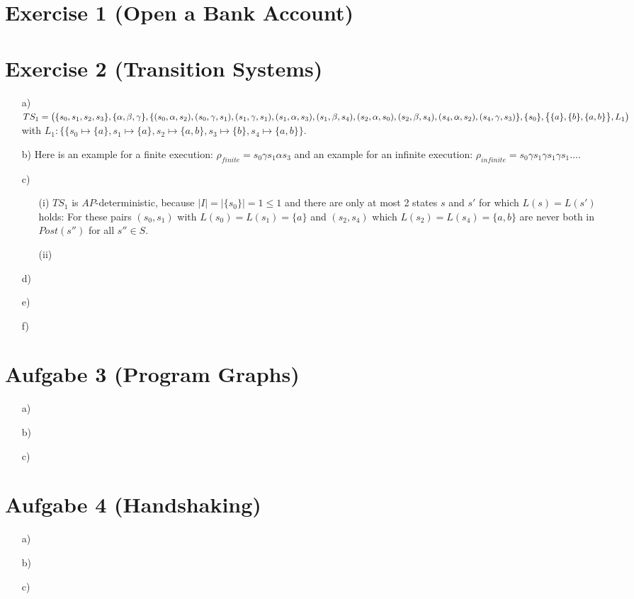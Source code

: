\documentclass[a4paper,11pt]{scrartcl}
\begin{document}
	
	\section*{Exercise 1 (Open a Bank Account)}
	
	
	\section*{Exercise 2 (Transition Systems)}
	
	\begin{itemize}
		\item[a)] $ TS_1 = \bigl( \{s_0, s_1, s_2, s_3\}, \{\alpha,\beta, \gamma\}, \\
		\{ (s_0, \alpha, s_2), (s_0, \gamma, s_1), (s_1, \gamma, s_1), (s_1, \alpha, s_3), (s_1, \beta, s_4), (s_2, \alpha, s_0), (s_2, \beta, s_4), (s_4, \alpha, s_2), (s_4, \gamma, s_3)\},\\
		\{s_0\}, \bigl\{ \{a\}, \{b\}, \{a,b\} \bigr\}, L_1 \bigr)$\\
		with $L_1: \bigl\{ \{s_0 \mapsto \{a\}, s_1 \mapsto \{a\}, s_2 \mapsto \{a,b\}, s_3 \mapsto \{b\}, s_4 \mapsto \{a,b\} \bigr\}$.
		\item[b)] Here is an example for a finite execution: $\rho_{finite} = s_0 \gamma s_1 \alpha s_3$ and an example for an infinite execution: $\rho_{infinite} = s_0 \gamma s_1 \gamma s_1 \gamma s_1 \dots$.
		\item[c)]
		\begin{itemize}
			\item[(i)] $TS_1$ is $AP$-deterministic, because $\mid I \mid = \mid \{s_0\} \mid = 1 \leq 1$ and there are only at most 2 states $s$ and $s'$ for which $L(s)=L(s')$ holds: For these pairs $(s_0, s_1)$ with $L(s_0)=L(s_1)=\{a\}$ and $(s_2, s_4)$ which $L(s_2)=L(s_4)=\{a, b\}$ are never both in $Post(s'')$ for all $s'' \in S$.
			
			
			\item[(ii)]
		\end{itemize}
		\item[d)]
		\item[e)]
		\item[f)]
	\end{itemize}
	
	\section*{Aufgabe 3 (Program Graphs)}
	\begin{itemize}
		\item[a)]
		\item[b)]
		\item[c)]
	\end{itemize}
		
	
	\section*{Aufgabe 4 (Handshaking)}
	
	\begin{itemize}
		\item[a)]
		\item[b)]
		\item[c)]
	\end{itemize}
	
\end{document}
